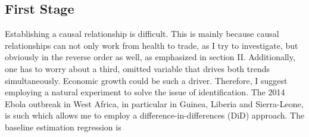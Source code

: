 \documentclass{article}
\begin{document}
\subsection{First Stage}

Establishing a causal relationship is difficult. This is mainly because causal relationships can not only work from health to trade, as I try to investigate, but obviously in the reverse order as well, as emphasized in section II. Additionally, one has to worry about a third, omitted variable that drives both trends simultaneously. Economic growth could be such a driver. Therefore, I suggest employing a natural experiment to solve the issue of identification. The 2014 Ebola outbreak in West Africa, in particular in Guinea, Liberia and Sierra-Leone, is such which allows me to employ a difference-in-differences (DiD) approach.
The baseline estimation regression is
\end{document}
